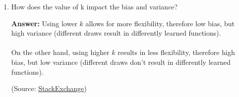 \documentclass{article}
\newenvironment{QandA}{\begin{enumerate}[label=\arabic*.]}{\end{enumerate}}
\newenvironment{InnerQandA}{\begin{enumerate}[label=\roman*.]}{\end{enumerate}}
\newenvironment{answer}{\par\normalfont \textbf{Answer:}}{}
\begin{document}
\begin{QandA}
\begin{InnerQandA}
\begin{answer}
            (Source: \href{https://stackoverflow.com/questions/11568897/value-of-k-in-k-nearest-neighbor-algorithm}{StackOverflow})
        \end{answer}

        \item How does the value of k impact the bias and variance?
        \begin{answer}
            Using lower $k$ allows for more flexibility, therefore low bias, but high variance (different draws result in differently learned functions).\\\\
            On the other hand, using higher $k$ results in less flexibility, therefore high bias, but low variance (different draws don't result in differently learned functions).
        
            (Source: \href{https://stats.stackexchange.com/questions/485884/bias-and-variance-in-knn-and-decision-trees}{StackExchange})
        \end{answer}
    \end{InnerQandA}


\end{QandA}
\end{document}

